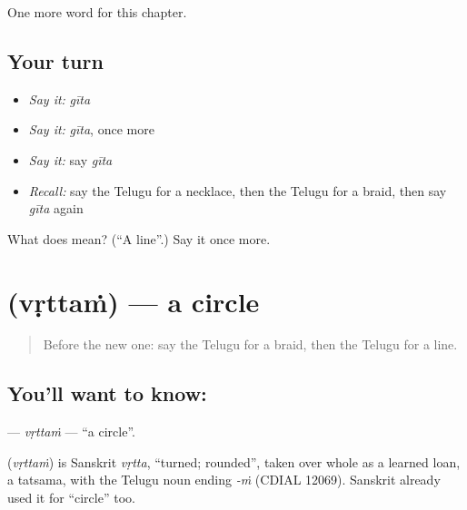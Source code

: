 \begin{grammarlens}[title={What you've built}]
One more word for this chapter.
\end{grammarlens}

\subsection*{Your turn}
\begin{itemize}
\raggedright
  \item \emph{Say it:} \emph{gīta}
  \item \emph{Say it:} \emph{gīta}, once more
  \item \emph{Say it:} say \emph{gīta}
  \item \emph{Recall:} say the Telugu for a necklace, then the Telugu for a braid, then say \emph{gīta} again
\end{itemize}

\begin{tcolorbox}[breakable,colback=teal!4,colframe=teal!35!black,title={Before you move on}]
What does  mean? (\textquotedblleft{}A line\textquotedblright{}.) Say it once more.
\end{tcolorbox}
\section[\texorpdfstring{\te{వృత్తం} (vṛttaṁ)}{వృత్తం (vṛttaṁ)}]{ (vṛttaṁ) — a circle}

\label{lesson:TE-C193-vrttam}



\begin{quote}
Before the new one: say the Telugu for a braid, then the Telugu for a line.
\end{quote}

\subsection*{You'll want to know: }
\textbf{} — \emph{vṛttaṁ} — \textquotedblleft{}a circle\textquotedblright{}.

\begin{cousinweb}
\textbf{} (\emph{vṛttaṁ}) is Sanskrit \emph{vṛtta}, \textquotedblleft{}turned; rounded\textquotedblright{}, taken over whole as a learned loan, a tatsama, with the Telugu noun ending \emph{-ṁ} (CDIAL 12069). Sanskrit already used it for \textquotedblleft{}circle\textquotedblright{} too.
\end{cousinweb}

